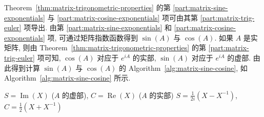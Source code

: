 {Theorem~\ref{thm:matrix-trigonometric-properties} 的第 \ref{part:matrix-sine-exponentials} 与 \ref{part:matrix-cosine-exponentials} 项可由其第 \ref{part:matrix-trig-euler} 项导出. 由第 \ref{part:matrix-sine-exponentials} 和 \ref{part:matrix-cosine-exponentials} 项, 可通过矩阵指数函数得到 $\sin(A)$ 与 $\cos(A)$. 如果 $A$ 是实矩阵, 则由 Theorem~\ref{thm:matrix-trigonometric-properties} 的第 \ref{part:matrix-trig-euler} 项可知, $\cos(A)$ 对应于 $e^{iA}$ 的实部, $\sin(A)$ 对应于 $e^{iA}$ 的虚部. 由此得到计算 $\sin(A)$ 与 $\cos(A)$ 的 Algorithm~\ref{alg:matrix-sine-cosine}, 如 Algorithm~\ref{alg:matrix-sine-cosine} 所示.}

\begin{algorithm}[H]\caption{{计算 $S=\sin(A)$ 和 $C=\cos(A)$}}\label{alg:matrix-sine-cosine}\begin{algorithmic}[1]
\State $S=\operatorname{Im}(X)$ ({$A$ 的虚部}), $C=\operatorname{Re}(X)$ ({$A$ 的实部})
\EndIf
{}
\State $S=\frac{1}{2i}(X-X^{-1})$, $C=\frac{1}{2}(X+X^{-1})$
\EndIf
\end{algorithmic}\end{algorithm}
